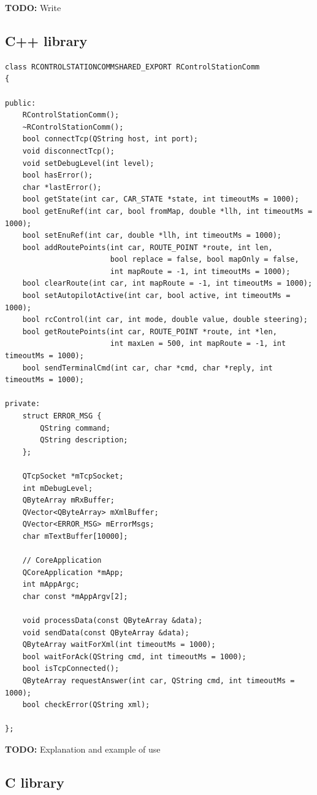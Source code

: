 \documentclass[12pt]{article} %
\newcommand{\todo}[1]{{\color{red} \textbf{TODO:} #1}}
\begin{document}
\todo{Write}
\subsection{C++ library}

\begin{Verbatim}
class RCONTROLSTATIONCOMMSHARED_EXPORT RControlStationComm
{

public:
    RControlStationComm();
    ~RControlStationComm();
    bool connectTcp(QString host, int port);
    void disconnectTcp();
    void setDebugLevel(int level);
    bool hasError();
    char *lastError();
    bool getState(int car, CAR_STATE *state, int timeoutMs = 1000);
    bool getEnuRef(int car, bool fromMap, double *llh, int timeoutMs = 1000);
    bool setEnuRef(int car, double *llh, int timeoutMs = 1000);
    bool addRoutePoints(int car, ROUTE_POINT *route, int len,
                        bool replace = false, bool mapOnly = false,
                        int mapRoute = -1, int timeoutMs = 1000);
    bool clearRoute(int car, int mapRoute = -1, int timeoutMs = 1000);
    bool setAutopilotActive(int car, bool active, int timeoutMs = 1000);
    bool rcControl(int car, int mode, double value, double steering);
    bool getRoutePoints(int car, ROUTE_POINT *route, int *len,
                        int maxLen = 500, int mapRoute = -1, int timeoutMs = 1000);
    bool sendTerminalCmd(int car, char *cmd, char *reply, int timeoutMs = 1000);

private:
    struct ERROR_MSG {
        QString command;
        QString description;
    };

    QTcpSocket *mTcpSocket;
    int mDebugLevel;
    QByteArray mRxBuffer;
    QVector<QByteArray> mXmlBuffer;
    QVector<ERROR_MSG> mErrorMsgs;
    char mTextBuffer[10000];

    // CoreApplication
    QCoreApplication *mApp;
    int mAppArgc;
    char const *mAppArgv[2];

    void processData(const QByteArray &data);
    void sendData(const QByteArray &data);
    QByteArray waitForXml(int timeoutMs = 1000);
    bool waitForAck(QString cmd, int timeoutMs = 1000);
    bool isTcpConnected();
    QByteArray requestAnswer(int car, QString cmd, int timeoutMs = 1000);
    bool checkError(QString xml);

};
\end{Verbatim}

\todo{Explanation and example of use} 


\subsection{C library}
\end{document}
